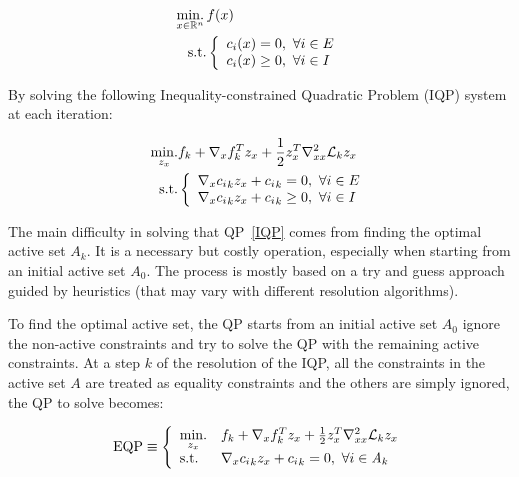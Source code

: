 \begin{equation}
\begin{aligned}
  \operatorname*{min.}_{x\in\mathbb{R}^n}{}&{f(x)}\\
  \text{s.t.}&
  \left\{
  \begin{array}{l}
    c_i(x) = 0,\ \forall i\in{E}\\
    c_i(x) \geq 0,\ \forall i\in{I}\\
  \end{array}
  \right.
\end{aligned}
\end{equation}

By solving the following Inequality-constrained Quadratic Problem (IQP) system at each iteration:

\begin{equation}
\label{IQP}
  \begin{aligned}
    \operatorname*{min.}\limits_{z_x} &f_k + \nabla_x f_k ^T z_x + \frac{1}{2} z_x^T\nabla_{xx}^2\mathcal{L}_k z_x \\
    \text{s.t.} &
  \left\{
  \begin{array}{l}
    \nabla_x {c_i}_k z_x + {c_i}_k = 0 ,\ \forall i\in E\\
    \nabla_x {c_i}_k z_x + {c_i}_k \geq 0 ,\ \forall i\in I\\
  \end{array}
  \right.
  \end{aligned}
\end{equation}

The main difficulty in solving that QP~\ref{IQP} comes from finding the optimal active set $\mathit{A}_k$.
It is a necessary but costly operation, especially when starting from an initial active set $\mathit{A}_0$.
The process is mostly based on a try and guess approach guided by heuristics (that may vary with different resolution algorithms).

To find the optimal active set, the QP starts from an initial active set $\mathit{A}_0$ ignore the non-active constraints and try to solve the QP with the remaining active constraints.
At a step $k$ of the resolution of the IQP, all the constraints in the active set $\mathit{A}$ are treated as equality constraints and the others are simply ignored, the QP to solve becomes:

\begin{equation}
  \text{EQP} \equiv \left\{
  \begin{array}{ll}
    \operatorname*{min.}\limits_{z_x} &f_k + \nabla_x f_k ^T z_x + \frac{1}{2} z_x^T\nabla_{xx}^2\mathcal{L}_k z_x \\
    \text{s.t.} & \nabla_x {c_i}_k z_x + {c_i}_k = 0 ,\ \forall i\in \mathit{A}_k\\
  \end{array}
  \right.
\end{equation}

